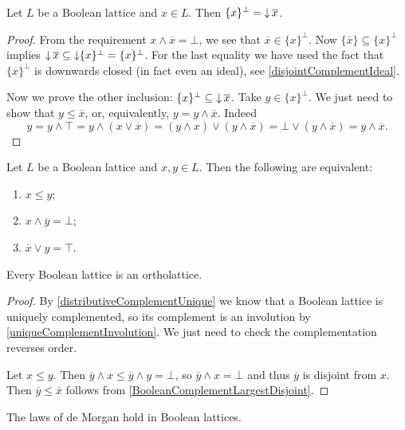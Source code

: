 \begin{lemma} \label{BooleanComplementLargestDisjoint}
Let $L$ be a Boolean lattice and $x\in L$. Then $\{x\}^\perp = \mathop{\downarrow} \overline{x}$.
\end{lemma}
\begin{proof}
From the requirement $x\wedge \overline{x} = \bot$, we see that $\overline{x}\in \{x\}^\perp$. Now $\{\overline{x}\} \subseteq \{x\}^\perp$ implies $\mathop{\downarrow} \overline{x} \subseteq \mathop{\downarrow}\{x\}^\perp = \{x\}^\perp$. For the last equality we have used the fact that $\{x\}^\perp$ is downwards closed (in fact even an ideal), see \ref{disjointComplementIdeal}.

Now we prove the other inclusion: $\{x\}^\perp \subseteq \mathop{\downarrow} \overline{x}$.
Take $y\in \{x\}^\perp$. We just need to show that $y\leq \overline{x}$, or, equivalently, $y = y\wedge \overline{x}$. Indeed
\[ y = y \wedge \top = y\wedge (x\vee \overline{x}) = (y\wedge x)\vee (y\wedge \overline{x}) = \bot \vee (y\wedge \overline{x}) = y\wedge \overline{x}. \]
\end{proof}
    \begin{corollary} \label{BooleanInequalities}
Let $L$ be a Boolean lattice and $x,y\in L$. Then the following are equivalent:
\begin{enumerate}
\item $x \leq y$;
\item $x\wedge \overline{y} = \bot$;
\item $\overline{x} \vee y = \top$.
\end{enumerate}
\end{corollary}
\begin{corollary}
Every Boolean lattice is an ortholattice.
\end{corollary}
\begin{proof}
By \ref{distributiveComplementUnique} we know that a Boolean lattice is uniquely complemented, so its complement is an involution by \ref{uniqueComplementInvolution}. We just need to check the complementation reverses order.

Let $x\leq y$. Then $\overline{y} \wedge x \leq \overline{y} \wedge y = \bot$, so $\overline{y} \wedge x = \bot$ and thus $\overline{y}$ is disjoint from $x$. Then $\overline{y} \leq \overline{x}$ follows from \ref{BooleanComplementLargestDisjoint}.
\end{proof}
\begin{corollary}
The laws of de Morgan hold in Boolean lattices.
\end{corollary}

